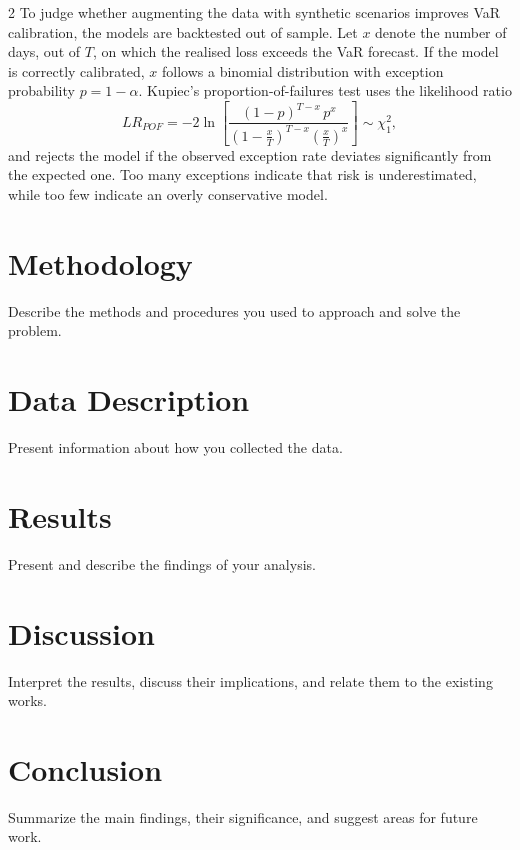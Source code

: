 \documentclass[12pt]{spieman}  %
\begin{document}
\begin{spacing}{2}
To judge whether augmenting the data with synthetic scenarios improves VaR calibration, the models are backtested out of sample. Let $x$ denote the number of days, out of $T$, on which the realised loss exceeds the VaR forecast. If the model is correctly calibrated, $x$ follows a binomial distribution with exception probability $p = 1-\alpha$. Kupiec's proportion-of-failures test \cite{Kupiec95} uses the likelihood ratio
\begin{equation}
LR_{POF} = -2\ln\left[\frac{(1-p)^{T-x}\,p^{x}}{\left(1-\frac{x}{T}\right)^{T-x}\left(\frac{x}{T}\right)^{x}}\right] \sim \chi^2_1,
\end{equation}
and rejects the model if the observed exception rate deviates significantly from the expected one. Too many exceptions indicate that risk is underestimated, while too few indicate an overly conservative model.

\section{Methodology}

Describe the methods and procedures you used to approach and solve the problem.

\section{Data Description}

Present information about how you collected the data.

\section{Results}

Present and describe the findings of your analysis.

\section{Discussion}

Interpret the results, discuss their implications, and relate them to the existing works.

\section{Conclusion}

Summarize the main findings, their significance, and suggest areas for future work.



\end{spacing}
\end{document}
